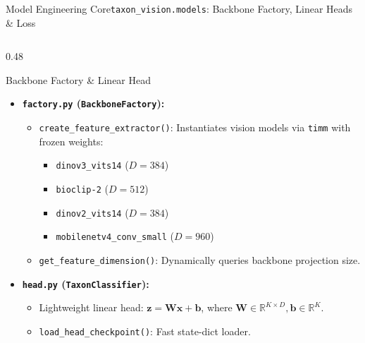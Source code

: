 \begin{frame}{Model Engineering Core}{\texttt{taxon\_vision.models}: Backbone Factory, Linear Heads \& Loss}
    \begin{columns}[T]
        \begin{column}{0.48\textwidth}
            \begin{block}{Backbone Factory \& Linear Head}
                \begin{itemize}\scriptsize
                    \item \textbf{\texttt{factory.py} (\texttt{BackboneFactory}):}
                        \begin{itemize}\tiny
                            \item \texttt{create\_feature\_extractor()}: Instantiates vision models via \texttt{timm} with frozen weights:
                                \begin{itemize}\tiny
                                    \item \texttt{dinov3\_vits14} ($D = 384$)
                                    \item \texttt{bioclip-2} ($D = 512$)
                                    \item \texttt{dinov2\_vits14} ($D = 384$)
                                    \item \texttt{mobilenetv4\_conv\_small} ($D = 960$)
                                \end{itemize}
                            \item \texttt{get\_feature\_dimension()}: Dynamically queries backbone projection size.
                        \end{itemize}
                    \item \textbf{\texttt{head.py} (\texttt{TaxonClassifier}):}
                        \begin{itemize}\tiny
                            \item Lightweight linear head: $\mathbf{z} = \mathbf{W}\mathbf{x} + \mathbf{b}$, where $\mathbf{W} \in \mathbb{R}^{K \times D}, \mathbf{b} \in \mathbb{R}^K$.
                            \item \texttt{load\_head\_checkpoint()}: Fast state-dict loader.
                        \end{itemize}
                \end{itemize}

\end{block}
\end{column}
\end{columns}
\end{frame}
